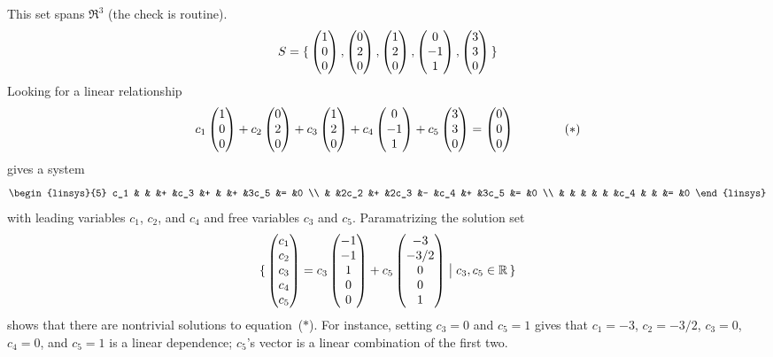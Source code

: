 \begin{example}  \label{ex:ShrinkSetSameSpan}
This set spans \( \Re^3 \) (the check is routine).
\begin{equation*}
  S=\mbox{$\{\,\begin{pmatrix} 1 \\ 0 \\ 0 \end{pmatrix},
     \begin{pmatrix} 0 \\ 2 \\ 0 \end{pmatrix},
     \begin{pmatrix} 1 \\ 2 \\ 0 \end{pmatrix},
     \begin{pmatrix} 0 \\ -1 \\ 1 \end{pmatrix},
     \begin{pmatrix} 3 \\ 3 \\ 0 \end{pmatrix}  \,\}$}
\end{equation*}
Looking for a linear relationship
\begin{equation*}
  c_1\begin{pmatrix} 1 \\ 0 \\ 0 \end{pmatrix}
  +c_2\begin{pmatrix} 0 \\ 2 \\ 0 \end{pmatrix}
  +c_3\begin{pmatrix} 1 \\ 2 \\ 0 \end{pmatrix}
  +c_4\begin{pmatrix} 0 \\ -1 \\ 1 \end{pmatrix}
  +c_5\begin{pmatrix} 3 \\ 3 \\ 0 \end{pmatrix}
  =\begin{pmatrix} 0 \\ 0 \\ 0 \end{pmatrix}\qquad\tag{$*$}
\end{equation*}
gives a system 
\begin{equation*}
  \begin{linsys}{5}
     c_1  &   &      &+  &c_3   &+  &    &+  &3c_5 &= &0  \\
          &   &2c_2  &+  &2c_3  &-  &c_4 &+  &3c_5 &= &0  \\
          &   &      &   &     &   &c_4  &   &     &= &0  
\end{linsys}
\end{equation*}
with leading variables $c_1$, $c_2$, and $c_4$ and
free variables $c_3$ and $c_5$.
Paramatrizing the solution set
\begin{equation*}
  \mbox{$\{\,\begin{pmatrix} c_1 \\ c_2 \\ c_3 \\ c_4 \\ c_5 \end{pmatrix}=
     c_3\begin{pmatrix} -1 \\ -1 \\ 1 \\ 0 \\ 0 \end{pmatrix}
     +c_5\begin{pmatrix} -3 \\ -3/2 \\ 0 \\ 0 \\ 1 \end{pmatrix}
     \bigm| c_3,c_5\in\mathbb{R} \,\}$}
\end{equation*}
shows that there are nontrivial solutions to equation~($*$).
For instance, setting \( c_3=0 \) and \( c_5=1 \)
gives that $c_1=-3$, $c_2=-3/2$, $c_3=0$, $c_4=0$, and $c_5=1$ is a linear
dependence;
$c_5$'s vector is a linear combination of the first two.


\end{example}
